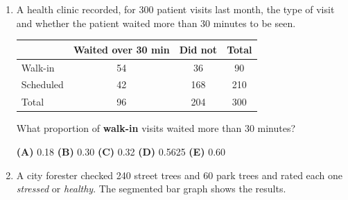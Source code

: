 \documentclass[12pt]{article}
\begin{document}
\begin{enumerate}[leftmargin=1.9em, itemsep=0.13in]

  \item A health clinic recorded, for 300 patient visits last month, the type of visit and
        whether the patient waited more than 30 minutes to be seen.

        \vspace{2pt}
        {\centering\small
        \renewcommand{\arraystretch}{1.15}
        \begin{tabular}{@{} l c c c @{}}
        \rowcolor{sky}
         & \textbf{Waited over 30 min} & \textbf{Did not} & \textbf{Total} \\
        \midrule
        Walk-in   & 54 & 36  & 90  \\
        Scheduled & 42 & 168 & 210 \\
        \midrule
        Total     & 96 & 204 & 300 \\
        \end{tabular}\par}
        \vspace{4pt}

        What proportion of \textbf{walk-in} visits waited more than 30 minutes?\hfill{}\rule[-0.2in]{0pt}{0.48in}
        \par\vspace{3pt}\noindent
        \hspace{1.2em}\textbf{(A)} 0.18 \hfill \textbf{(B)} 0.30 \hfill
        \textbf{(C)} 0.32 \hfill \textbf{(D)} 0.5625 \hfill \textbf{(E)} 0.60

  \boxguard[18]%
  \item A city forester checked 240 street trees and 60 park trees and rated each one
        \emph{stressed} or \emph{healthy}. The segmented bar graph shows the results.


\end{enumerate}
\end{document}
